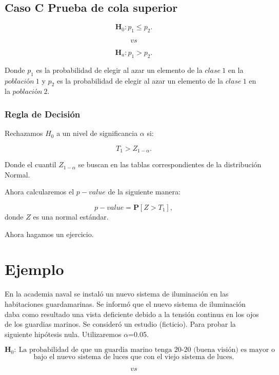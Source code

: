 \documentclass[
  a4paper,
  oneside,
  openany]{book}
\begin{document}
\hypertarget{caso-c-prueba-de-cola-superior-6}{%
\subsection*{Caso C Prueba de cola superior}\label{caso-c-prueba-de-cola-superior-6}}


\[\textbf{H}_0: p_{1} \leq p_{2}.\]

\[vs\]

\[\textbf{H}_a: p_{1} > p_{2}.\]

Donde \(p_{1}\) es la probabilidad de elegir al azar un elemento de la \(clase\ 1\) en la \(población\ 1\) y \(p_{2}\) es la probabilidad de elegir al azar un elemento de la \(clase\ 1\) en la \(población\ 2\).

\hypertarget{regla-de-decisiuxf3n-23}{%
\subsubsection*{Regla de Decisión}\label{regla-de-decisiuxf3n-23}}


Rechazamos \(H_0\) a un nivel de significancia \(\alpha\) si:

\[T_{1} > Z_{1-\alpha}.\]

Donde el cuantil \(Z_{1-\alpha}\) se buscan en las tablas correspondientes de la distribución Normal.

Ahora calcularemos el \(p-value\) de la siguiente manera:

\[p-value=\mathbf{P}[Z>T_{1}],\]
donde \(Z\) es una normal estándar.

Ahora hagamos un ejercicio.

\hypertarget{ejemplo-10}{%
\section{Ejemplo}\label{ejemplo-10}}

En la academia naval se instaló un nuevo sistema de iluminación en las habitaciones guardamarinas. Se informó que el nuevo sistema de iluminación daba como resultado una vista deficiente debido a la tensión continua en los ojos de los guardias marinos. Se consideró un estudio (ficticio). Para probar la siguiente hipótesis nula. Utilizaremos \(\alpha\)=0.05.

\[\textbf{H}_0: \ \mbox{La probabilidad de que un guardia marino tenga 20-20 (buena visión) es mayor o igual}\]
\[\mbox{bajo el nuevo sistema de luces que con el viejo sistema de luces.}\]

\[vs\]
\end{document}
